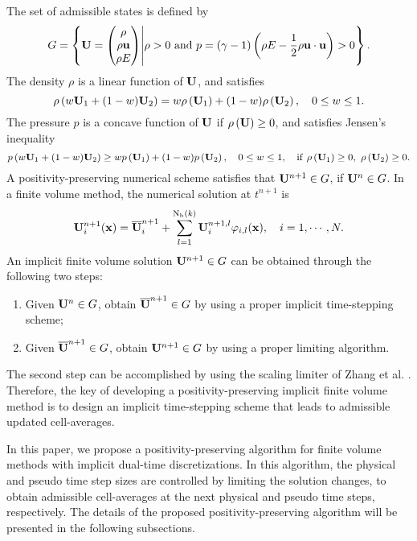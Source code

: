 The set of admissible states is defined by
\begin{equation}
	G= \left\{\mathbf{U} =  \begin{pmatrix}
		\rho \\ \rho \mathbf{u} \\ \rho E
	\end{pmatrix} \middle| \rho>0 \ \mathrm{and} \ p= 
	\left(\gamma-1\right) \left(\rho E - \dfrac{1}{2} \rho \mathbf{u} \cdot \mathbf{u}\right) >0 \right\}.
\end{equation}
The density $\rho$ is a linear function of $\mathbf{U}$, and satisfies
\begin{equation}
	\label{eq:density-linear}
		\rho\left(w\mathbf{U}_1+(1-w)\mathbf{U}_2\right) = w\rho\left(\mathbf{U}_1\right) + (1-w) \rho \left(\mathbf{U}_2\right) , \quad 0 \leq w \leq 1.
\end{equation}
The pressure $p$ is a concave function of $\mathbf{U}$ if $\rho\left(\mathbf{U}\right) \geq 0$, and satisfies Jensen's inequality
\begin{equation}
	\label{eq:pressure-Jensen}
		p \left(w\mathbf{U}_1+(1-w)\mathbf{U}_2\right)  \geq w p\left(\mathbf{U}_1\right) + (1-w) p \left(\mathbf{U}_2\right), \quad 0 \leq w \leq 1, \quad \mathrm{if} \ \rho\left(\mathbf{U}_1\right) \geq 0, \ \rho\left(\mathbf{U}_2\right) \geq 0.
\end{equation}
A positivity-preserving numerical scheme satisfies that $\mathbf{U}^{n+1} \in G$, if $\mathbf{U}^{n} \in G$.  In a finite volume method, the numerical solution at $t^{n+1}$ is
\begin{equation}
	\mathbf{U}^{n+1}_i (\mathbf{x})= \overline{\mathbf{U}}^{n+1}_i + \sum_{l=1}^{\mathrm{N_b}(k)}{\mathbf{U}_i^{n+1,l} \varphi_{i,l}(\mathbf{x}) }, \quad i=1, \cdots,N.
\end{equation}
An implicit finite volume solution $\mathbf{U}^{n+1} \in G$ can be obtained through the following two steps:
\begin{enumerate}[label=(\arabic*)]
	\item Given $\mathbf{U}^n \in G$, obtain $\overline{\mathbf{U}}^{n+1} \in G$ by using a proper implicit time-stepping scheme;
	\item Given $\overline{\mathbf{U}}^{n+1} \in G$, obtain $\mathbf{U}^{n+1} \in G$ by using a proper limiting algorithm.
\end{enumerate}  
The second step can be accomplished by using the scaling limiter of Zhang et al. \cite{zhang2010positivity}. Therefore, the key of developing a positivity-preserving implicit finite volume method is to design an implicit time-stepping scheme that leads to admissible updated cell-averages.

In this paper, we propose a positivity-preserving algorithm for finite volume methods with implicit dual-time discretizations. In this algorithm, the physical and pseudo time step sizes are controlled by limiting the solution changes, to obtain admissible cell-averages at the next physical and pseudo time steps, respectively. The details of the proposed positivity-preserving algorithm will be presented in the following subsections.

